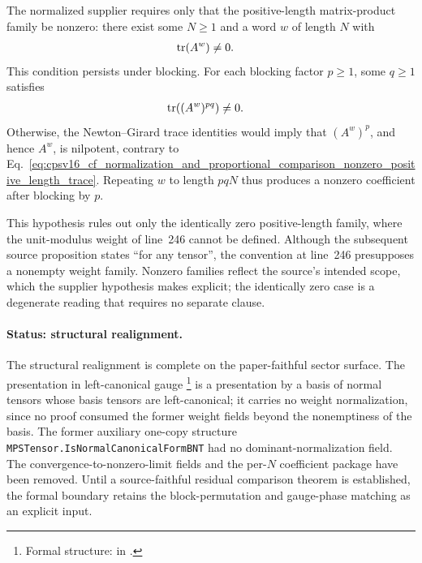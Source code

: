\documentclass{article}
\begin{document}
The normalized supplier requires only that the positive-length matrix-product
family be nonzero: there exist some $N\geq 1$ and a word $w$ of length $N$
with
\begin{align}
    \operatorname{tr}(A^w)
        &\neq 0.
    \label{eq:cpsv16_cf_normalization_and_proportional_comparison_nonzero_positive_length_trace}
\end{align}
This condition persists under blocking. For each blocking factor $p\geq 1$,
some $q\geq 1$ satisfies
\begin{align}
    \operatorname{tr}((A^w)^{pq})
        &\neq 0.
    \label{eq:cpsv16_cf_normalization_and_proportional_comparison_nonzero_blocked_trace}
\end{align}
Otherwise, the Newton--Girard trace identities would imply that $(A^w)^p$,
and hence $A^w$, is nilpotent, contrary to
Eq.~\ref{eq:cpsv16_cf_normalization_and_proportional_comparison_nonzero_positive_length_trace}.
Repeating $w$ to length $pqN$ thus produces a nonzero coefficient after
blocking by $p$.

This hypothesis rules out only the identically zero positive-length family,
where the unit-modulus weight of line~246 cannot be defined. Although the
subsequent source proposition states ``for any tensor'', the convention at
line~246 presupposes a nonempty weight family. Nonzero families reflect the
source's intended scope, which the supplier hypothesis makes explicit; the
identically zero case is a degenerate reading that requires no separate
clause.

\paragraph{Status: structural realignment.}

The structural realignment is complete on the paper-faithful sector surface.
The presentation in left-canonical gauge
\footnote{%
    Formal structure:  in
    .}
is a presentation by a basis of normal tensors whose basis tensors are
left-canonical; it carries no weight normalization, since no proof consumed
the former weight fields beyond the nonemptiness of the basis.
The former auxiliary one-copy structure
\texttt{MPSTensor.IsNormalCanonicalFormBNT} had no dominant-normalization field.
The convergence-to-nonzero-limit fields and the per-$N$ coefficient package
have been removed. Until a source-faithful
residual comparison theorem is established, the formal boundary retains the
block-permutation and gauge-phase matching as an explicit input.
\end{document}
